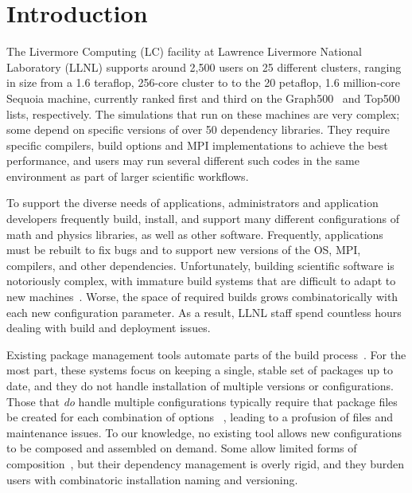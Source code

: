
\section{Introduction}
\label{sec:intro}

The Livermore Computing (LC) facility at Lawrence Livermore National Laboratory
(LLNL) supports around 2,500 users on 25 different clusters, ranging 
in size from a 1.6 teraflop, 256-core cluster to to the
20 petaflop, 1.6 million-core Sequoia machine, currently ranked first and
third on the Graph500~\cite{graph500} and Top500~\cite{top500}
lists, respectively.
%
%
The simulations that run on these machines are very complex; some
depend on specific versions of over 50 dependency libraries.
They require specific compilers, build options and MPI implementations to
achieve the best performance, and users may run several
different such codes in the same environment as part of larger 
scientific workflows.

To support the diverse needs of applications, administrators and application
developers 
frequently build, install, and support many different configurations
of math and physics libraries, as well as other software.
Frequently, applications must be rebuilt to fix bugs and to support
new versions of the OS, MPI, compilers, and other dependencies.
Unfortunately, building scientific software is notoriously complex, with
immature build systems that are difficult to adapt to new
machines~\cite{dubois+:comp-sci-eng,hoste+:pyhpc12,wilson+:corr}.
Worse, the space of required builds grows combinatorically
with each new configuration parameter. As a result, LLNL staff
spend countless hours dealing with build and deployment issues.

Existing package management tools automate parts of the build 
process~\cite{bsdports,digirolamo:smithy,dolstra+:icfp08,dolstra+:lisa04,hashdist,homebrew,hoste+:pyhpc12,macports,thiruvathukal:gentoo04}.
For the most part, these systems focus on keeping a single, stable set of 
packages up to date, and they do not handle installation of multiple
versions or configurations.  Those that {\it do} handle multiple configurations
typically require that package files be created for each combination of 
options~ \cite{digirolamo:smithy,dolstra+:icfp08,dolstra+:lisa04,hashdist,hoste+:pyhpc12}, 
leading to a profusion of files and maintenance issues.
To our knowledge, no existing tool allows new configurations to be composed
and assembled on demand.  Some allow limited forms of 
composition~\cite{hoste+:pyhpc12,dolstra+:icfp08,dolstra+:lisa04}, but their
dependency management is overly rigid, and they burden users with
combinatoric installation naming and versioning.

